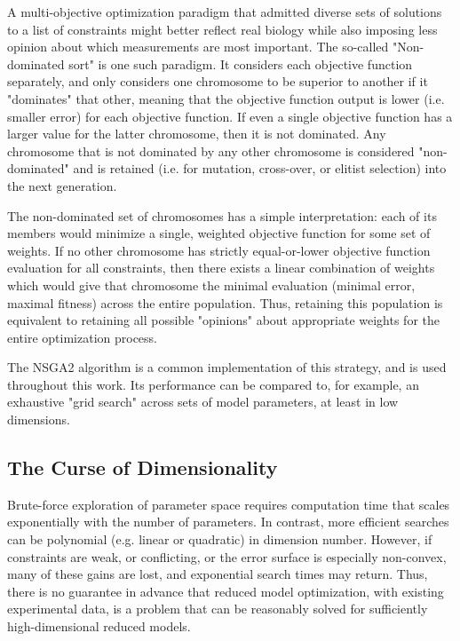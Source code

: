 A multi-objective optimization paradigm that admitted diverse sets of solutions to a list of constraints might better reflect real biology while also imposing less opinion about which measurements are most important.
The so-called "Non-dominated sort" is one such paradigm.
It considers each objective function separately, and only considers one chromosome to be superior to another if it "dominates" that other, meaning that the objective function output is lower (i.e. smaller error) for each objective function.
If even a single objective function has a larger value for the latter chromosome, then it is not dominated.  Any chromosome that is not dominated by any other chromosome is considered "non-dominated" and is retained (i.e. for mutation, cross-over, or elitist selection) into the next generation.

The non-dominated set of chromosomes has a simple interpretation: each of its members would minimize a single, weighted objective function for some set of weights.
If no other chromosome has strictly equal-or-lower objective function evaluation for all constraints, then there exists a linear combination of weights which would give that chromosome the minimal evaluation (minimal error, maximal fitness) across the entire population.
Thus, retaining this population is equivalent to retaining all possible "opinions" about appropriate weights for the entire optimization process.

The NSGA2 algorithm \cite{deb2000fast} is a common implementation of this strategy, and is used throughout this work.  Its performance can be compared to, for example, an exhaustive "grid search" across sets of model parameters, at least in low dimensions.  

\subsection{The Curse of Dimensionality}
Brute-force exploration of parameter space requires computation time that scales exponentially with the number of parameters.  In contrast, more efficient searches can be polynomial (e.g. linear or quadratic) in dimension number.  However, if constraints are weak, or conflicting, or the error surface is especially non-convex, many of these gains are lost, and exponential search times may return.  Thus, there is no guarantee in advance that reduced model optimization, with existing experimental data, is a problem that can be reasonably solved for sufficiently high-dimensional reduced models.

